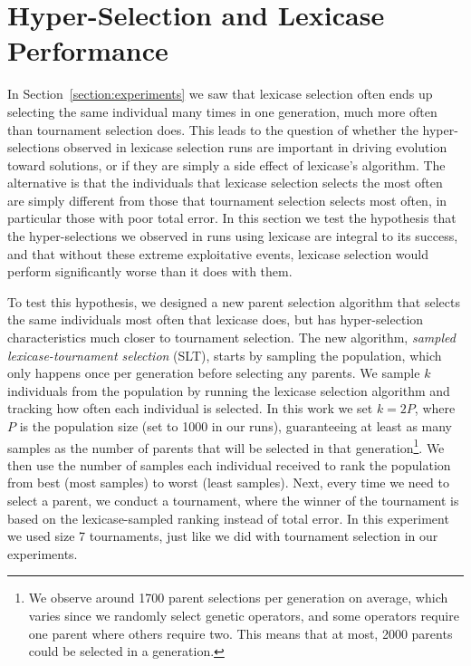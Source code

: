 \documentclass{sig-alternate}
\newcommand{\definition}[1]{\textit{#1}}
\begin{document}
\section{Hyper-Selection and Lexicase\\Performance}
\label{section:HyperSelectionandLexicasePerformance}

In Section~\ref{section:experiments} we saw that lexicase selection often ends up selecting the same individual many times in one generation, much more often than tournament selection does. This leads to the question of whether the hyper-selections observed in lexicase selection runs are important in driving evolution toward solutions, or if they are simply a side effect of lexicase's algorithm. The alternative is that the individuals that lexicase selection selects the most often are simply different from those that tournament selection selects most often, in particular those with poor total error. In this section we test the hypothesis that the hyper-selections we observed in runs using lexicase are integral to its success, and that without these extreme exploitative events, lexicase selection would perform significantly worse than it does with them.

To test this hypothesis, we designed a new parent selection algorithm that selects the same individuals most often that lexicase does, but has hyper-selection characteristics much closer to tournament selection. The new algorithm, \definition{sampled lexicase-tournament selection} (SLT), starts by sampling the population, which only happens once per generation before selecting any parents. We sample $k$ individuals from the population by running the lexicase selection algorithm and tracking how often each individual is selected. In this work we set $k = 2P$, where $P$ is the population size (set to 1000 in our runs), guaranteeing at least as many samples as the number of parents that will be selected in that generation\footnote{We observe around 1700 parent selections per generation on average, which varies since we randomly select genetic operators, and some operators require one parent where others require two. This means that at most, 2000 parents could be selected in a generation.}. We then use the number of samples each individual received to rank the population from best (most samples) to worst (least samples). Next, every time we need to select a parent, we conduct a tournament, where the winner of the tournament is based on the lexicase-sampled ranking instead of total error. In this experiment we used size 7 tournaments, just like we did with tournament selection in our experiments.
\end{document}
